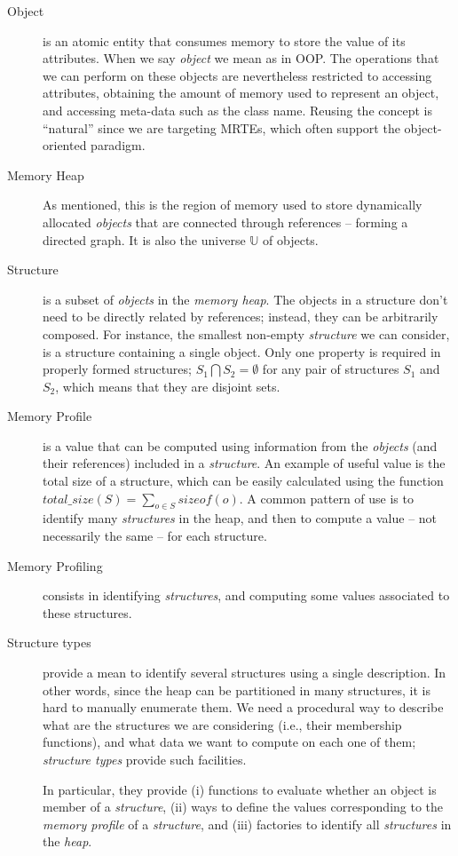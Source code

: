 \begin{description}
\item[Object] is an atomic entity that consumes memory to store the value of its attributes.
When we say \textit{object} we mean as in \gls{OOP}.
The operations that we can perform on these objects are nevertheless restricted to accessing attributes, obtaining the amount of memory used to represent an object, and accessing meta-data such as the class name.
Reusing the concept is ``natural'' since we are targeting MRTEs, which often support the object-oriented paradigm.

\item[Memory Heap] As mentioned, this is the region of memory used to store dynamically allocated \textit{objects} that are connected through references -- forming a directed graph.
It is also the universe $\mathbb{U}$ of objects.

\item[Structure] is a subset of \textit{objects} in the \textit{memory heap}.
The objects in a structure don't need to be directly related by references; instead, they can be arbitrarily composed.
For instance, the smallest non-empty \textit{structure} we can consider, is a structure containing a single object.
Only one property is required in properly formed structures;  $S_1 \bigcap S_2 = \emptyset$ for any pair of structures $S_1$ and $S_2$, which means that they are disjoint sets.

\item[Memory Profile] is a value that can be computed using information from the \textit{objects} (and their references) included in a \textit{structure}.
An example of useful value is the total size of a structure, which can be easily calculated using the function $\textit{total\_size}\left(S\right) = \sum_{o \in S} {sizeof(o)}$.
A common pattern of use is to identify many \textit{structures} in the heap, and then to compute a value -- not necessarily the same -- for each structure.

\item[Memory Profiling] consists in identifying \textit{structures}, and computing some values associated to these structures. 

\item[Structure types] provide a mean to identify several structures using a single description.
In other words, since the heap can be partitioned in many structures, it is hard to manually enumerate them.
We need a procedural way to describe what are the structures we are considering (i.e., their membership functions), and what data we want to compute on each one of them; \textit{structure types} provide such facilities.

In particular, they provide (i) functions to evaluate whether an object is member of a \textit{structure}, (ii) ways to define the values corresponding to the \textit{memory profile} of a \textit{structure}, and (iii) factories to identify all \textit{structures} in the \textit{heap}.

\end{description}

